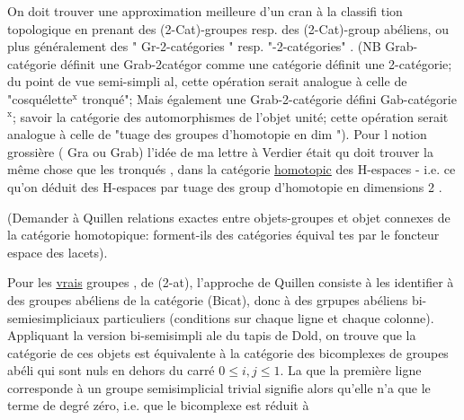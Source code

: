 
On doit trouver une approximation meilleure d'un cran à la classifi
tion topologique en prenant des  (2-Cat)-groupes resp. des (2-Cat)-group
abéliens,  ou plus généralement des " Gr-2-catégories "  resp.
"-2-catégories" . (NB   Grab-catégorie définit une Grab-2catégor
comme une catégorie définit une 2-catégorie; du point de vue semi-simpli
al, cette opération serait analogue à celle de "cosquélette$^{\text{x}}$ tronqué";
Mais également une Grab-2-catégorie défini  Gab-catégorie$^{\text{x}}$; savoir la
catégorie des automorphismes de l'objet unité; cette  opération serait
analogue à celle de "tuage des groupes d'homotopie en dim \hand{$>$}"). Pour l
notion grossière ( Gra ou Grab) l'idée de ma lettre à Verdier était qu
doit trouver la même chose que les tronqués , dans la catégorie \uline{homotopic}
des H-espaces  -  i.e. ce qu'on déduit des H-espaces par tuage des group
d'homotopie en dimensions \hand{$>$}2 .

(Demander à Quillen relations exactes entre objets-groupes et objet
connexes de la catégorie homotopique: forment-ils des catégories équival
tes par le foncteur espace des lacets).

Pour les \uline{vrais} groupes , de (2-at), l'approche de Quillen consiste à
les identifier  à des groupes abéliens de la catégorie (Bicat),
donc à des grpupes abéliens bi-semiesimpliciaux particuliers (conditions
sur chaque ligne et chaque colonne). Appliquant la version bi-semisimpli
ale du tapis de Dold, on trouve que  la catégorie de ces objets
est équivalente à la catégorie des  bicomplexes  de groupes  abéli
qui sont nuls en dehors du carré  $0 \leq i,j \leq 1$.   La 
que la première ligne corresponde à un  groupe semisimplicial
trivial signifie alors qu'elle n'a que le terme de degré zéro, i.e. que
le bicomplexe est réduit à


